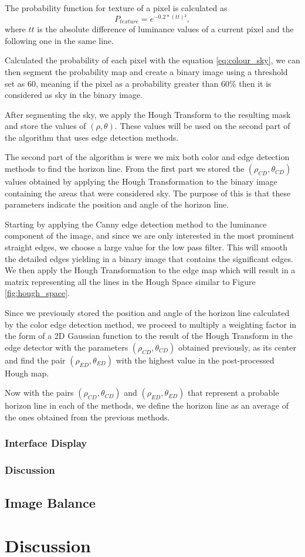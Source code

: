 The probability function for texture of a pixel is calculated as
\begin{equation}
	P_{texture} = e^{-0.2*(tt)²},
\end{equation}
where $tt$ is the absolute difference of luminance values of a current pixel and the following one in the same line.

Calculated the probability of each pixel with the equation \ref{eq:colour_sky}, we can then segment the probability map and create a binary image using a threshold set as 60, meaning if the pixel as a probability greater than 60\% then it is considered as sky in the binary image.

After segmenting the sky, we apply the Hough Transform to the resulting mask and store the values of $(\rho,\theta)$. These values will be used on the second part of the algorithm that uses edge detection methods.

The second part of the algorithm is were we mix both color and edge detection methods to find the horizon line. From the first part we stored the $(\rho_{CD},\theta_{CD})$ values obtained by applying the Hough Transformation to the binary image containing the areas that were considered sky. The purpose of this is that these parameters indicate the position and angle of the horizon line.

Starting by applying the Canny edge detection method to the luminance component of the image, and since we are only interested in the most prominent straight edges, we choose a large value for the low pass filter. This will smooth the detailed edges yielding in a binary image that contains the significant edges. We then apply the Hough Transformation to the edge map which will result in a matrix representing all the lines in the Hough Space similar to Figure \ref{fig:hough_space}.

Since we previously stored the position and angle of the horizon line calculated by the color edge detection method, we proceed to multiply a weighting factor in the form of a 2D Gaussian function to the result of the Hough Transform in the edge detector with the parameters $(\rho_{CD},\theta_{CD})$ obtained previously, as its center and find the pair $(\rho_{ED}, \theta_{ED})$ with the highest value in the post-processed Hough map.

Now with the pairs $(\rho_{CD}, \theta_{CD})$ and $(\rho_{ED}, \theta_{ED})$ that represent a probable horizon line in each of the methods, we define the horizon line as an average of the ones obtained from the previous methods.
\subsubsection{Interface Display}


\subsubsection{Discussion}

\subsection{Image Balance}
\label{sub:balance}

\section{Discussion}
\label{sec:system_discussion}